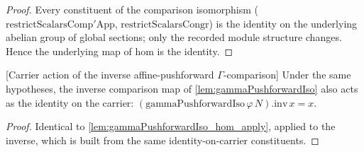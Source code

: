 \begin{proof}
  Every constituent of the comparison isomorphism
  (\(\mathrm{restrictScalarsComp'App}\), \(\mathrm{restrictScalarsCongr}\)) is the identity
  on the underlying abelian group of global sections; only the recorded module structure
  changes. Hence the underlying map of \(\mathrm{hom}\) is the identity.
\end{proof}

\begin{lemma}


[Carrier action of the inverse affine-pushforward \(\Gamma\)-comparison]
  \label{lem:gammaPushforwardIso_inv_apply}
  Under the same hypotheses, the inverse comparison map of \cref{lem:gammaPushforwardIso}
  also acts as the identity on the carrier: \((\mathrm{gammaPushforwardIso}\,\varphi\,N).\mathrm{inv}\,x = x\).
\end{lemma}

\begin{proof}
  Identical to \cref{lem:gammaPushforwardIso_hom_apply}, applied to the inverse, which is
  built from the same identity-on-carrier constituents.
\end{proof}

